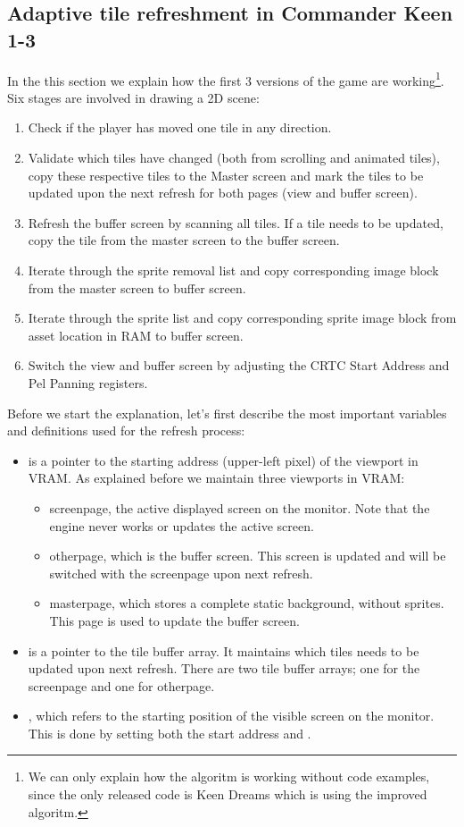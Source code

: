 \documentclass[book.tex]{subfiles}
\begin{document}
\subsection{Adaptive tile refreshment in Commander Keen 1-3}
In the this section we explain how the first 3 versions of the game are working\footnote{We can only explain how the algoritm is working without code examples, since the only released code is Keen Dreams which is using the improved algoritm.}. Six stages are involved in drawing a 2D scene:
\begin{enumerate}
\item Check if the player has moved one tile in any direction.
\item Validate which tiles have changed (both from scrolling and animated tiles), copy these respective tiles to the Master screen and mark the tiles to be updated upon the next refresh for both pages (view and buffer screen).
\item Refresh the buffer screen by scanning all tiles. If a tile needs to be updated, copy the tile from the master screen to the buffer screen.
\item Iterate through the sprite removal list and copy corresponding image block from the master screen to buffer screen. 
\item Iterate through the sprite list and copy corresponding sprite image block from asset location in RAM to buffer screen.
\item Switch the view and buffer screen by adjusting the CRTC Start Address and Pel Panning registers.
\end{enumerate}

Before we start the explanation, let's first describe the most important variables and definitions used for the refresh process:
\begin{itemize}
  \item {} is a pointer to the starting address (upper-left pixel) of the viewport in VRAM. As explained before we maintain three viewports in VRAM:
  \begin{itemize}
    \item screenpage, the active displayed screen on the monitor. Note that the engine never works or updates the active screen.
    \item otherpage, which is the buffer screen. This screen is updated and will be switched with the screenpage upon next refresh.
    \item masterpage, which stores a complete static background, without sprites. This page is used to update the buffer screen.
  \end{itemize}
  \item {} is a pointer to the tile buffer array. It maintains which tiles needs to be updated upon next refresh. There are two tile buffer arrays; one for the screenpage and one for otherpage.
  \item {}, which refers to the starting position of the visible screen on the monitor. This is done by setting both the  start address and . 
\end{itemize}
\end{document}
